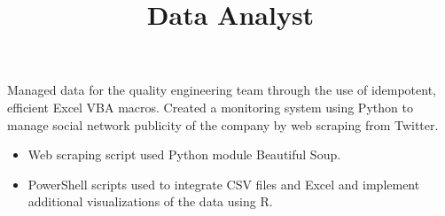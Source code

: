 \documentclass[margin]{res}
\begin{document}
\begin{resume}
\title{\textbf{Data Analyst}}
\begin{position}
	Managed data for the quality engineering team through the use of idempotent, efficient Excel VBA macros. Created a monitoring system using Python to manage social network publicity of the company by web scraping from Twitter.
	\begin{itemize}
		\item Web scraping script used Python module Beautiful Soup.
		\item PowerShell scripts used to integrate CSV files and Excel and implement additional visualizations of the data using R.
	\end{itemize}
\end{position}





\end{resume}
\end{document}
